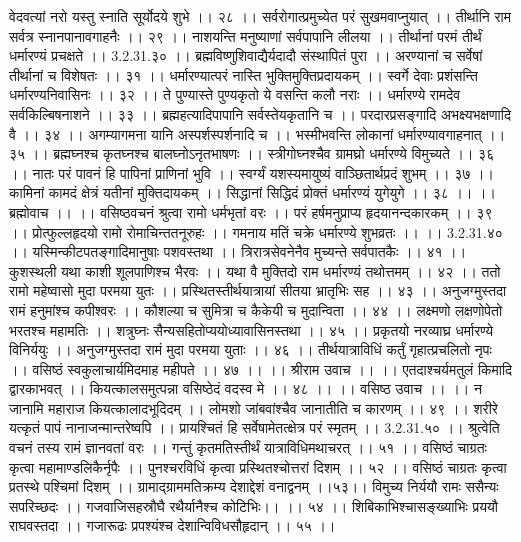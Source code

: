 वेदवत्यां नरो यस्तु स्नाति सूर्योदये शुभे ।। २८ ।।
सर्वरोगात्प्रमुच्येत परं सुखमवाप्नुयात् ।।
तीर्थानि राम सर्वत्र स्नानपानावगाहनैः ।। २९ ।।
नाशयन्ति मनुष्याणां सर्वपापानि लीलया ।।
तीर्थानां परमं तीर्थं धर्मारण्यं प्रचक्षते ।। 3.2.31.३० ।।
ब्रह्मविष्णुशिवाद्यैर्यदादौ संस्थापितं पुरा ।।
अरण्यानां च सर्वेषां तीर्थानां च विशेषतः ।। ३१ ।।
धर्मारण्यात्परं नास्ति भुक्तिमुक्तिप्रदायकम् ।।
स्वर्गे देवाः प्रशंसन्ति धर्मारण्यनिवासिनः ।। ३२ ।।
ते पुण्यास्ते पुण्यकृतो ये वसन्ति कलौ नराः ।।
धर्मारण्ये रामदेव सर्वकिल्बिषनाशने ।। ३३ ।।
ब्रह्महत्यादिपापानि सर्वस्तेयकृतानि च ।।
परदारप्रसङ्गादि अभक्ष्यभक्षणादि वै ।। ३४ ।।
अगम्यागमना यानि अस्पर्शस्पर्शनादि च ।।
भस्मीभवन्ति लोकानां धर्मारण्यावगाहनात् ।। ३५ ।।
ब्रह्मघ्नश्च कृतघ्नश्च बालघ्नोऽनृतभाषणः ।।
स्त्रीगोघ्नश्चैव ग्रामघ्रो धर्मारण्ये विमुच्यते ।। ३६ ।।
नातः परं पावनं हि पापिनां प्राणिनां भुवि ।।
स्वर्ग्यं यशस्यमायुष्यं वाञ्छितार्थप्रदं शुभम् ।। ३७ ।।
कामिनां कामदं क्षेत्रं यतीनां मुक्तिदायकम् ।।
सिद्धानां सिद्धिदं प्रोक्तं धर्मारण्यं युगेयुगे ।। ३८ ।।
।। ब्रह्मोवाच ।। ।।
वसिष्ठवचनं श्रुत्वा रामो धर्मभृतां वरः ।।
परं हर्षमनुप्राप्य हृदयानन्दकारकम् ।। ३९ ।।
प्रोत्फुल्लहृदयो रामो रोमाचिन्ततनूरुहः ।।
गमनाय मतिं चक्रे धर्मारण्ये शुभव्रतः ।। ।। 3.2.31.४० ।।
यस्मिन्कीटपतङ्गादिमानुषाः पशवस्तथा ।।
त्रिरात्रसेवनेनैव मुच्यन्ते सर्वपातकैः ।। ४१ ।।
कुशस्थली यथा काशी शूलपाणिश्च भैरवः ।।
यथा वै मुक्तिदो राम धर्मारण्यं तथोत्तमम् ।। ४२ ।।
ततो रामो महेष्वासो मुदा परमया युतः ।।
प्रस्थितस्तीर्थयात्रायां सीतया भ्रातृभिः सह ।। ४३ ।।
अनुजग्मुस्तदा रामं हनुमांश्च कपीश्वरः ।।
कौशल्या च सुमित्रा च कैकेयी च मुदान्विता ।। ४४ ।।
लक्ष्मणो लक्षणोपेतो भरतश्च महामतिः ।।
शत्रुघ्नः सैन्यसहितोप्ययोध्यावासिनस्तथा ।। ४५ ।।
प्रकृतयो नरव्याघ्र धर्मारण्ये विनिर्ययुः ।।
अनुजग्मुस्तदा रामं मुदा परमया युताः ।। ४६ ।।
तीर्थयात्राविधिं कर्तुं गृहात्प्रचलितो नृपः ।।
वसिष्ठं स्वकुलाचार्यमिदमाह महीपते ।। ४७ ।।
।। श्रीराम उवाच ।। ।।
एतदाश्चर्यमतुलं किमादि द्वारकाभवत् ।।
कियत्कालसमुत्पन्ना वसिष्ठेदं वदस्व मे ।। ४८ ।।
।। वसिष्ठ उवाच ।। ।।
न जानामि महाराज कियत्कालादभूदिदम् ।।
लोमशो जांबवांश्चैव जानातीति च कारणम् ।। ४९ ।।
शरीरे यत्कृतं पापं नानाजन्मान्तरेष्वपि ।।
प्रायश्चितं हि सर्वेषामेतत्क्षेत्र परं स्मृतम् ।। 3.2.31.५० ।।
श्रुत्वेति वचनं तस्य रामं ज्ञानवतां वरः ।।
गन्तुं कृतमतिस्तीर्थं यात्राविधिमथाचरत् ।। ५१ ।।
वसिष्ठं चाग्रतः कृत्वा महामाण्डलिकैर्नृपैः ।।
पुनश्चरविधिं कृत्वा प्रस्थितश्चोत्तरां दिशम् ।। ५२ ।।
वसिष्ठं चाग्रतः कृत्वा प्रतस्थे पश्चिमां दिशम् ।।
ग्रामाद्ग्राममतिक्रम्य देशाद्देशं वनाद्वनम् ।।५३।।
विमुच्य निर्ययौ रामः ससैन्यः सपरिच्छदः ।।
गजवाजिसहस्रौघै रथैर्यानैश्च कोटिभिः।। ।। ५४ ।।
शिबिकाभिश्चासङ्ख्याभिः प्रययौ राघवस्तदा ।।
गजारूढः प्रपश्यंश्च देशान्विविधसौहृदान् ।। ५५ ।।
